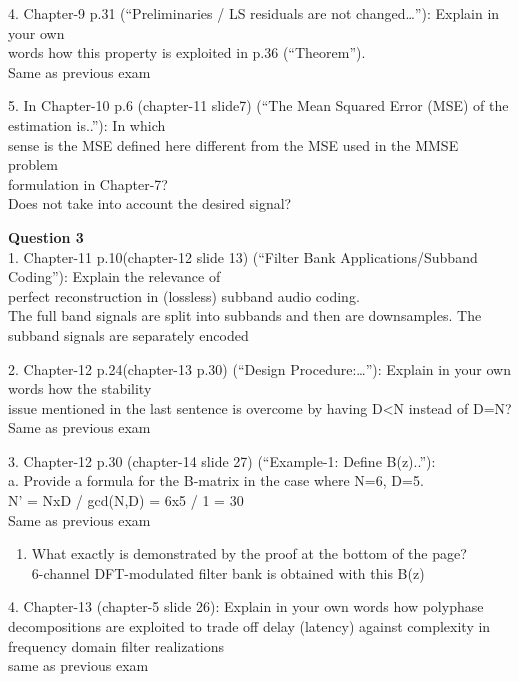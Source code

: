\documentclass[
  a4paper,
  ,captions=tableheading
]{scrartcl}
\providecommand{\tightlist}{%
  \setlength{\itemsep}{0pt}\setlength{\parskip}{0pt}}
\begin{document}
4. Chapter-9 p.31 (``Preliminaries / LS residuals are not
changed\ldots{}''): Explain in your own\\
words how this property is exploited in p.36 (``Theorem'').\\
Same as previous exam

5. In Chapter-10 p.6 (chapter-11 slide7) (``The Mean Squared Error (MSE)
of the estimation is..''): In which\\
sense is the MSE defined here different from the MSE used in the MMSE
problem\\
formulation in Chapter-7?\\
Does not take into account the desired signal?

\textbf{Question 3}\\
1. Chapter-11 p.10(chapter-12 slide 13) (``Filter Bank
Applications/Subband Coding''): Explain the relevance of\\
perfect reconstruction in (lossless) subband audio coding.\\
The full band signals are split into subbands and then are downsamples.
The subband signals are separately encoded

2. Chapter-12 p.24(chapter-13 p.30) (``Design Procedure:\ldots{}''):
Explain in your own words how the stability\\
issue mentioned in the last sentence is overcome by having D\textless N
instead of D=N?\\
Same as previous exam

3. Chapter-12 p.30 (chapter-14 slide 27) (``Example-1: Define
B(z)..''):\\
a. Provide a formula for the B-matrix in the case where N=6, D=5.\\
N' = NxD / gcd(N,D) = 6x5 / 1 = 30\\
Same as previous exam

\begin{enumerate}
\def\labelenumi{\alph{enumi}.}
\setcounter{enumi}{1}
\tightlist
\item
  What exactly is demonstrated by the proof at the bottom of the page?\\
  6-channel DFT-modulated filter bank is obtained with this B(z)
\end{enumerate}

4. Chapter-13 (chapter-5 slide 26): Explain in your own words how
polyphase decompositions are exploited to trade off delay (latency)
against complexity in frequency domain filter realizations\\
same as previous exam
\end{document}
